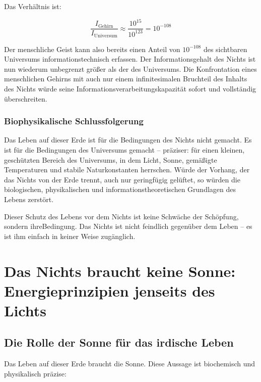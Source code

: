 ﻿\documentclass[12pt,a4paper]{report}
\begin{document}
Das Verhältnis ist:

\begin{equation}
	\frac{I_{\text{Gehirn}}}{I_{\text{Universum}}} \approx \frac{10^{15}}{10^{123}} = 10^{-108}
\end{equation}

Der menschliche Geist kann also bereits einen Anteil von $10^{-108}$ des sichtbaren Universums informationstechnisch erfassen. Der Informationsgehalt des Nichts ist nun wiederum unbegrenzt größer als der des Universums. Die Konfrontation eines menschlichen Gehirns mit auch nur einem infinitesimalen Bruchteil des Inhalts des Nichts würde seine Informationsverarbeitungskapazität sofort und vollständig überschreiten.

\subsubsection{Biophysikalische Schlussfolgerung}

Das Leben auf dieser Erde ist für die Bedingungen des Nichts nicht gemacht. Es ist für die Bedingungen des Universums gemacht -- präziser: für einen kleinen, geschützten Bereich des Universums, in dem Licht, Sonne, gemäßigte Temperaturen und stabile Naturkonstanten herrschen. Würde der Vorhang, der das Nichts von der Erde trennt, auch nur geringfügig gelüftet, so würden die biologischen, physikalischen und informationstheoretischen Grundlagen des Lebens zerstört.

Dieser Schutz des Lebens vor dem Nichts ist keine Schwäche der Schöpfung, sondern ihreBedingung. Das Nichts ist nicht feindlich gegenüber dem Leben -- es ist ihm einfach in keiner Weise zugänglich.

\section{Das Nichts braucht keine Sonne: Energieprinzipien jenseits des Lichts}

\subsection{Die Rolle der Sonne für das irdische Leben}

Das Leben auf dieser Erde braucht die Sonne. Diese Aussage ist biochemisch und physikalisch präzise:
\end{document}
